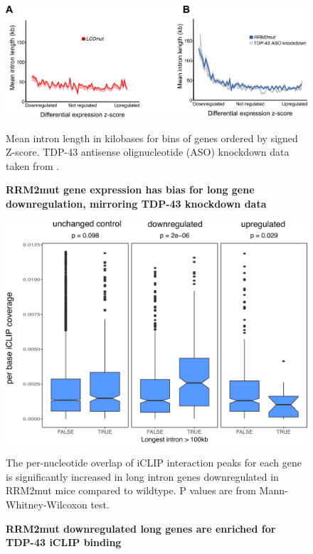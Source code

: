 \begin{figure}[h!]
	\begin{center}
		\includegraphics[width=14cm]{Figures/05_tdp_mice/long_genes.png}
	\end{center}
	\caption{\textbf{RRM2mut gene expression has bias for long gene downregulation, mirroring TDP-43 knockdown data}}
	Mean intron length in kilobases for bins of genes ordered by signed Z-score. TDP-43 antisense olignucleotide (ASO) knockdown data taken from \cite{Polymenidou2011-hs}.
	\label{fig:long_genes}
\end{figure}

\begin{figure}[h!]
	\begin{center}
		\includegraphics[width=14cm]{Figures/05_tdp_mice/long_genes_iclip.png}
	\end{center}
	\caption{\textbf{RRM2mut downregulated long genes are enriched for TDP-43 iCLIP binding}}
	The per-nucleotide overlap of iCLIP interaction peaks for each gene is significantly increased in long intron genes downregulated in RRM2mut mice compared to wildtype. P values are from Mann-Whitney-Wilcoxon test.
	\label{fig:long_genes_iclip}
\end{figure}



